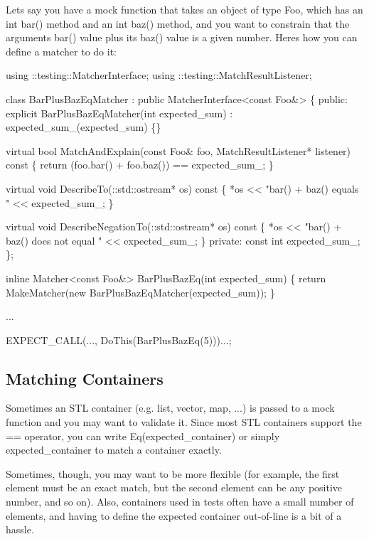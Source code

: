 Let\textquotesingle{}s say you have a mock function that takes an object of type {\ttfamily Foo}, which has an {\ttfamily int bar()} method and an {\ttfamily int baz()} method, and you want to constrain that the argument\textquotesingle{}s {\ttfamily bar()} value plus its {\ttfamily baz()} value is a given number. Here\textquotesingle{}s how you can define a matcher to do it\+:


\begin{DoxyCode}
using ::testing::MatcherInterface;
using ::testing::MatchResultListener;

class BarPlusBazEqMatcher : public MatcherInterface<const Foo&> \{
 public:
  explicit BarPlusBazEqMatcher(int expected\_sum)
      : expected\_sum\_(expected\_sum) \{\}

  virtual bool MatchAndExplain(const Foo& foo,
                               MatchResultListener* listener) const \{
    return (foo.bar() + foo.baz()) == expected\_sum\_;
  \}

  virtual void DescribeTo(::std::ostream* os) const \{
    *os << "bar() + baz() equals " << expected\_sum\_;
  \}

  virtual void DescribeNegationTo(::std::ostream* os) const \{
    *os << "bar() + baz() does not equal " << expected\_sum\_;
  \}
 private:
  const int expected\_sum\_;
\};

inline Matcher<const Foo&> BarPlusBazEq(int expected\_sum) \{
  return MakeMatcher(new BarPlusBazEqMatcher(expected\_sum));
\}

...

  EXPECT\_CALL(..., DoThis(BarPlusBazEq(5)))...;
\end{DoxyCode}


\subsection*{Matching Containers}

Sometimes an S\+TL container (e.\+g. list, vector, map, ...) is passed to a mock function and you may want to validate it. Since most S\+TL containers support the {\ttfamily ==} operator, you can write {\ttfamily Eq(expected\+\_\+container)} or simply {\ttfamily expected\+\_\+container} to match a container exactly.

Sometimes, though, you may want to be more flexible (for example, the first element must be an exact match, but the second element can be any positive number, and so on). Also, containers used in tests often have a small number of elements, and having to define the expected container out-\/of-\/line is a bit of a hassle.

